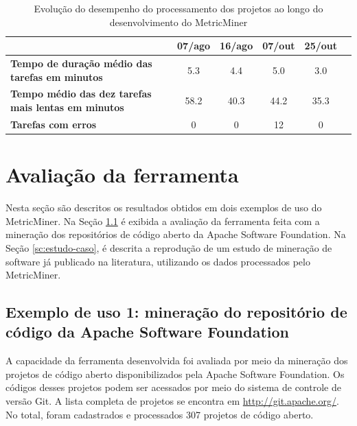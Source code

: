\documentclass[a4paper, 12pt, twoside]{book}
\begin{document}
        \begin{table}\begin{center}
        \begin{tabular}{| p{5cm} | c | c | c | c | c | }
            \hline                        
             & \textbf{07/ago} & \textbf{16/ago} & \textbf{07/out} & \textbf{25/out} \\
            \hline
            \textbf{Tempo de duração médio das tarefas em minutos} & 5.3 & 4.4 & 5.0 & 3.0 \\
            \hline
            \textbf{Tempo médio das dez tarefas mais lentas em minutos} & 58.2 & 40.3 & 44.2 & 35.3 \\
            \hline
            \textbf{Tarefas com erros} & 0 & 0 & 12 & 0 \\
            \hline
        \end{tabular}
        \caption{Evolução do desempenho do processamento dos projetos ao longo do desenvolvimento do MetricMiner \label{tab:evolucao}}
        \end{center}\end{table}

\chapter{Avaliação da ferramenta} \label{ch:avaliacao}
    
    Nesta seção são descritos os resultados obtidos em dois exemplos de uso do MetricMiner. Na Seção \ref{sc:apache} é exibida a avaliação da ferramenta feita com a mineração dos repositórios de código aberto da Apache Software Foundation. Na Seção \ref{sc:estudo-caso}, é descrita a reprodução de um estudo de mineração de software já publicado na literatura, utilizando os dados processados pelo MetricMiner.

    \section{Exemplo de uso 1: mineração do repositório de código da Apache Software Foundation} \label{sc:apache}

        A capacidade da ferramenta desenvolvida foi avaliada por meio da mineração dos projetos de código aberto disponibilizados pela Apache Software Foundation. Os códigos desses projetos podem ser acessados por meio do sistema de controle de versão Git. A lista completa de projetos se encontra em \url{http://git.apache.org/}. No total, foram cadastrados e processados 307 projetos de código aberto.
\end{document}
